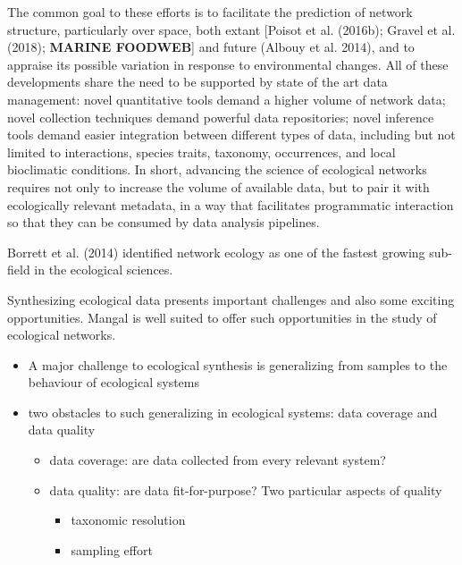 The common goal to these efforts is to facilitate the prediction of
network structure, particularly over space, both extant {[}Poisot et al.
(2016b); Gravel et al. (2018); \textbf{MARINE FOODWEB}{]} and future
(Albouy et al. 2014), and to appraise its possible variation in response
to environmental changes. All of these developments share the need to be
supported by state of the art data management: novel quantitative tools
demand a higher volume of network data; novel collection techniques
demand powerful data repositories; novel inference tools demand easier
integration between different types of data, including but not limited
to interactions, species traits, taxonomy, occurrences, and local
bioclimatic conditions. In short, advancing the science of ecological
networks requires not only to increase the volume of available data, but
to pair it with ecologically relevant metadata, in a way that
facilitates programmatic interaction so that they can be consumed by
data analysis pipelines.

Borrett et al. (2014) identified network ecology as one of the fastest
growing sub-field in the ecological sciences.

Synthesizing ecological data presents important challenges and also some
exciting opportunities. Mangal is well suited to offer such
opportunities in the study of ecological networks.

\begin{itemize}
\tightlist
\item
  A major challenge to ecological synthesis is generalizing from samples
  to the behaviour of ecological systems
\item
  two obstacles to such generalizing in ecological systems: data
  coverage and data quality

  \begin{itemize}
  \tightlist
  \item
    data coverage: are data collected from every relevant system?
  \item
    data quality: are data fit-for-purpose? Two particular aspects of
    quality

    \begin{itemize}
    \tightlist
    \item
      taxonomic resolution
    \item
      sampling effort
    \end{itemize}
  \end{itemize}
\end{itemize}

